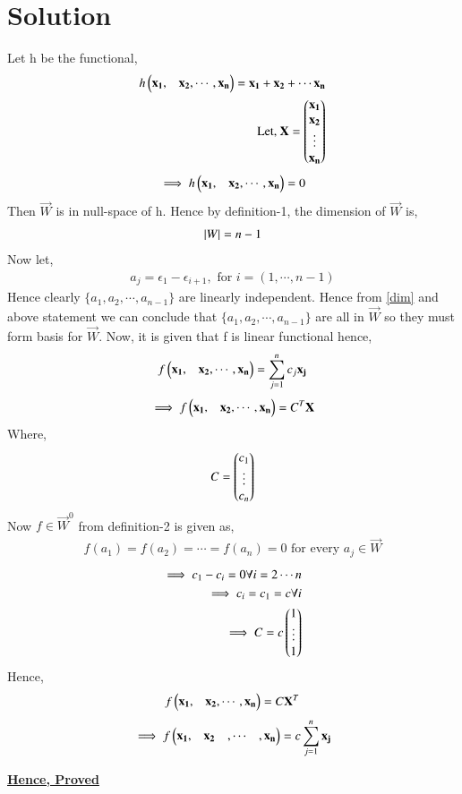 \documentclass[journal,12pt,twocolumn]{IEEEtran}
\begin{document}
\section{Solution}
Let h be the functional,
\begin{align}
h\begin{pmatrix}\mathbf{x_1},&\mathbf{x_2},\cdots ,\mathbf{x_n}\end{pmatrix} = \mathbf{x_1}+\mathbf{x_2}+\cdots \mathbf{x_n}\\
\mbox{Let, } \mathbf{X} = \begin{pmatrix}\mathbf{x_1}\\\mathbf{x_2}\\\vdots\\\mathbf{x_n}\end{pmatrix}
\end{align}
\begin{align}
\implies h\begin{pmatrix}\mathbf{x_1},&\mathbf{x_2},\cdots ,\mathbf{x_n}\end{pmatrix} = 0
\end{align}
Then $\vec{W}$ is in null-space of h. Hence by definition-1, the dimension of $\vec{W}$ is,
\begin{align}
\left\vert W\right\vert = n - 1
\label{dim}
\end{align}
Now let, 
\begin{align}
a_j = \epsilon_1-\epsilon_{i+1}, \mbox{ for } i = (1,\cdots ,n-1)
\label{aj} 
\end{align}
Hence clearly $\{a_1, a_2, \cdots, a_{n-1}\}$ are linearly independent. Hence from \eqref{dim} and above statement we can conclude that $\{a_1, a_2, \cdots, a_{n-1}\}$ are all in $\vec{W}$ so they must form basis for $\vec{W}$. Now, it is given that f is linear functional hence,
\begin{align}
f\begin{pmatrix}\mathbf{x_1},&\mathbf{x_2},\cdots ,\mathbf{x_n}\end{pmatrix} = \sum_{j=1}^{n}c_j\mathbf{x_j}
\end{align}
\begin{align}
\implies f\begin{pmatrix}\mathbf{x_1},&\mathbf{x_2},\cdots ,\mathbf{x_n}\end{pmatrix} = C^T\mathbf{X}
\end{align}
Where,
\begin{align}
C = \begin{pmatrix}c_1\\\vdots\\c_n\end{pmatrix}
\end{align}
Now $f \in \vec{W}^0$ from definition-2 is given as,
\begin{align}
f(a_1) = f(a_2) = \cdots = f(a_n) = 0 \mbox{ for every } a_j \in \vec{W}
\end{align}
\begin{align}
\implies c_1 - c_i = 0 \forall i= 2\cdots n\\
\implies c_i = c_1 = c \forall i\\
\implies C = c\begin{pmatrix}1\\\vdots\\1\end{pmatrix}
\end{align}
Hence,
\begin{align}
f\begin{pmatrix}\mathbf{x_1},&\mathbf{x_2},\cdots ,\mathbf{x_n}\end{pmatrix} = C\mathbf{X}^T
\end{align}
\begin{align}
\implies f\begin{pmatrix}\mathbf{x_1},&\mathbf{x_2}&,\cdots &,\mathbf{x_n}\end{pmatrix} = c\sum_{j=1}^{n}\mathbf{x_j}
\end{align}
\centerline{\uline{\bfseries Hence, Proved}}
\end{document}
